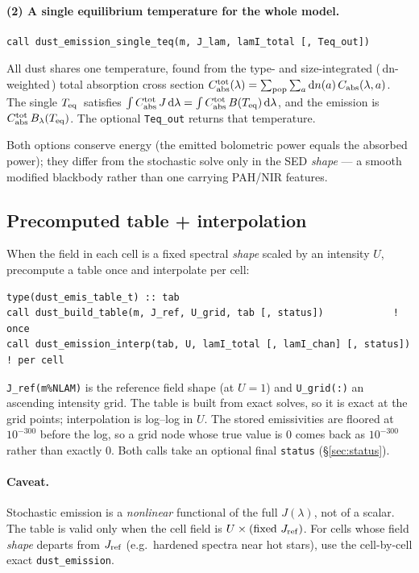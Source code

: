 \documentclass{my_memo}
\newcommand{\code}[1]{\texttt{#1}}
\newcommand{\Teq}{\ensuremath{T_{\rm eq}}}
\begin{document}
\paragraph{(2) A single equilibrium temperature for the whole model.}
\begin{lstlisting}
call dust_emission_single_teq(m, J_lam, lamI_total [, Teq_out])
\end{lstlisting}
All dust shares one temperature, found from the type- and size-integrated
(\,dn-weighted\,) total absorption cross section
$C_{\rm abs}^{\rm tot}(\lambda) = \sum_{\rm pop}\sum_a {\rm d}n(a)\,C_{\rm abs}(\lambda,a)$.
The single \Teq\ satisfies $\int C_{\rm abs}^{\rm tot}\,J\,{\rm d}\lambda =
\int C_{\rm abs}^{\rm tot}\,B(\Teq)\,{\rm d}\lambda$, and the emission is
$C_{\rm abs}^{\rm tot}\,B_\lambda(\Teq)$. The optional \code{Teq\_out} returns that
temperature.

Both options conserve energy (the emitted bolometric power equals the absorbed
power); they differ from the stochastic solve only in the SED \emph{shape} ---
a smooth modified blackbody rather than one carrying PAH/NIR features.

\subsection{Precomputed table + interpolation}

When the field in each cell is a fixed spectral \emph{shape} scaled by an intensity
$U$, precompute a table once and interpolate per cell:
\begin{lstlisting}
type(dust_emis_table_t) :: tab
call dust_build_table(m, J_ref, U_grid, tab [, status])            ! once
call dust_emission_interp(tab, U, lamI_total [, lamI_chan] [, status])  ! per cell
\end{lstlisting}
\code{J\_ref(m\%NLAM)} is the reference field shape (at $U{=}1$) and
\code{U\_grid(:)} an ascending intensity grid. The table is built from exact
solves, so it is exact at the grid points; interpolation is log--log in $U$.
The stored emissivities are floored at $10^{-300}$ before the log, so a grid
node whose true value is $0$ comes back as $10^{-300}$ rather than exactly $0$.
Both calls take an optional final \code{status} (\S\ref{sec:status}).

\paragraph{Caveat.} Stochastic emission is a \emph{nonlinear} functional of the
full $J(\lambda)$, not of a scalar. The table is valid only when the cell field
is $U\times(\text{fixed }J_{\rm ref})$. For cells whose field \emph{shape}
departs from $J_{\rm ref}$ (e.g.\ hardened spectra near hot stars), use the
cell-by-cell exact \code{dust\_emission}.
\end{document}
